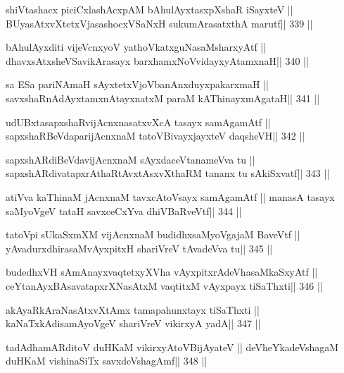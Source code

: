 \begin{shl}
shiVtashacx piciCxlashAcxpAM bAhulAyxtasxpXshaR iSayxteV ||
BUyasAtxvXtetxVjasashocxVSaNxH sukumArasatxthA marutf\hfill || 339 ||
\end{shl}

\begin{shl}
bAhulAyxditi vijeVcnxyoV yathoVkatxguNasaMsharxyAtf ||
dhavxsAtxsheVSavikArasayx barxhamxNoV\s vidayxyA\s\s tamxnaH\hfill || 340 ||
\end{shl}

\begin{shl}
sa ESa pariNAmaH sAyxtetxVjoVbanAnxduyxpakarxmaH ||
savxshaRnAdAyxtamxnA\s tayxnatxM paraM kAThinayxmAgataH\hfill || 341 ||
\end{shl}

\begin{shl}
udUBxtasapxshaRvijAcnxnasatxvXcA tasayx samAgamAtf ||
sapxshaRBeVdaparijAcnxnaM tatoV\s BivayxjayxteV daqsheVH\hfill || 342 ||
\end{shl}

\begin{shl}
sapxshARdiBeVdavijAcnxnaM sAyxdaceVtanameVva tu ||
sapxshARdivatapxrAthaRtAvxtAsxvXthaRM tananx tu sAkiSxvatf\hfill || 343 ||
\end{shl}

\begin{shl}
atiVva kaThinaM jAcnxnaM tavxcAtoV\s sayx samAgamAtf ||
manasA tasayx saMyoVgeV tataH savxceCxYva dhiVBaRveVtf\hfill || 344 ||
\end{shl}

\begin{shl}
tatoV\s pi sUkaSxmXM vijAcnxnaM budidhxsaMyoVgajaM BaveVtf ||
yAvadurxdhirasaMvAyxpitxH shariVreV tAvadeVva tu\hfill || 345 ||
\end{shl}

\begin{shl}
budedhxVH sAmAnayxvaqtetxyXVha vAyxpitxrAdeVhasaMkaSxyAtf ||
ceYtanAyxBAsavatapxrXNasAtxM vaqtitxM vAyxpayx tiSaThxti\hfill || 346 ||
\end{shl}

\begin{shl}
akAyaRkAraNasAtxvXtAmx tamapahunxtayx tiSaThxti ||
kaNaTxkAdisamAyoVgeV shariVreV vikirxyA yadA\hfill || 347 ||
\end{shl}

\begin{shl}
tadA\s dhamARditoV duHKaM vikirxyAtoV\s BijAyateV ||
deVheYkadeVshagaM duHKaM vishinaSiTx savxdeVshagAmf\hfill || 348 ||
\end{shl}

